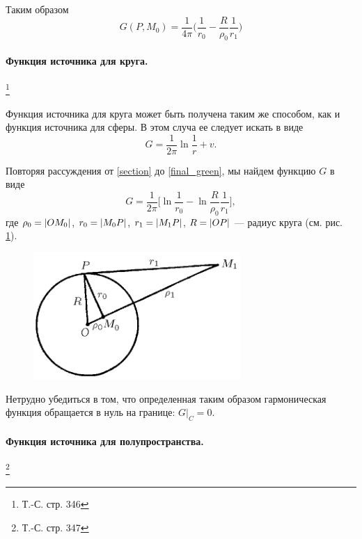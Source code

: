 Таким образом 
\begin{equation} \label{final_green}
	G(P, M_0) = \frac{1}{4 \pi} \Bigg(\frac{1}{r_0} - \frac{R}{\rho_0} \frac{1}{r_1}\Bigg)
\end{equation}

\paragraph{Функция источника для круга.}\footnote{Т.-С. стр. 346}

Функция источника для круга может быть получена таким же способом, как и функция источника для сферы. В этом случа ее следует искать в виде
\begin{equation}
	G = \frac{1}{2 \pi} \ln{\frac{1}{r}} + v.
\end{equation}

Повторяя рассуждения от \eqref{section} до \eqref{final_green}, мы найдем функцию $G$ в виде 
\begin{equation}
	G = \frac{1}{2 \pi} \Bigg[\ln{\frac{1}{r_0}} - \ln{\frac{R}{\rho_0} \frac{1}{r_1}}\Bigg],
\end{equation}
где $\rho_0 = \abs{OM_0}$, $r_0 = \abs{M_0 P}$, $r_1 = \abs{M_1 P}$, $R = \abs{OP}$ --- радиус круга (см. рис. \ref{circle_green}).
\begin{figure}[H]
	\centering
	\includegraphics[width=0.4\linewidth]{img/circle_green}
	\caption{}
	\label{circle_green}
\end{figure}
Нетрудно убедиться в том, что определенная таким образом гармоническая функция обращается в нуль на границе: $G|_{C} = 0$.

\paragraph{Функция источника для полупространства.}\footnote{Т.-С. стр. 347}

